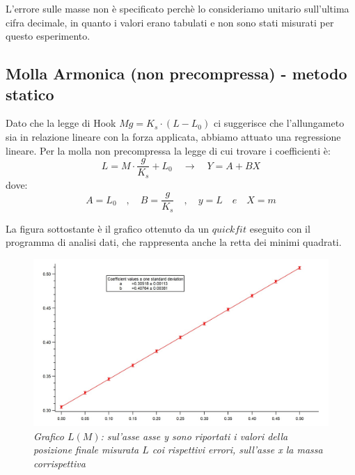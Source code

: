\documentclass[12pt, a4paper]{article}
\begin{document}
L'errore sulle masse non è specificato perchè lo consideriamo unitario sull'ultima cifra decimale, 
in quanto i valori erano tabulati e non sono stati misurati per questo esperimento. 



\subsection{Molla Armonica (non precompressa) - metodo statico}
\label{Molla non precompressa, statico}
Dato che la legge di Hook $Mg=K_s\cdot(L-L_0)$ ci suggerisce che l'allungameto sia in relazione lineare con la forza applicata, abbiamo attuato una regressione lineare. 
Per la molla non precompressa la legge di cui trovare i coefficienti è: 
\begin{equation*}
    L=M\cdot\displaystyle\frac{g}{K_s}+L_0
    \quad \xrightarrow{} \quad Y = A + BX
\end{equation*} 
dove:
\begin{equation*}
 A= L_0 \quad , \quad B=\displaystyle\frac{g}{K_s} \quad , \quad y = L \quad e \quad X = m
\end{equation*}
\bigskip

La figura sottostante è il grafico ottenuto da un $quick fit$ eseguito con il programma di analisi dati, che rappresenta anche la retta dei minimi quadrati.\\
\begin{figure}[h]
    \includegraphics[width=150mm]{IMMAGINI/Graph Molla Arm Stat.jpg}
    \centering
    \caption{\textit{{\footnotesize{Grafico $L(M)$}: sul'asse asse \textit{y} sono riportati i valori della posizione finale misurata $L$ coi rispettivi errori, sull'asse \textit{x} la massa corrispettiva}}}
    \label{Grafico parabolico}
\end{figure}
\bigskip
\end{document}
